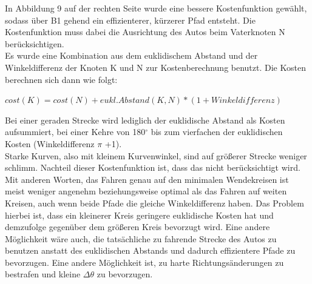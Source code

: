 In Abbildung 9 auf der rechten Seite wurde eine bessere Kostenfunktion gewählt, sodass über B1 gehend ein effizienterer, kürzerer Pfad entsteht. Die Kostenfunktion muss dabei die Ausrichtung des Autos beim Vaterknoten N berücksichtigen. \\
Es wurde eine Kombination aus dem euklidischem Abstand und der Winkeldifferenz der Knoten K und N zur Kostenberechnung benutzt. Die Kosten berechnen sich dann wie folgt: 
\begin{center}
$cost(K) = cost(N) +eukl. Abstand(K,N) * (1+Winkeldifferenz)$
\end{center} 
Bei einer geraden Strecke wird lediglich der euklidische Abstand als Kosten aufsummiert, bei einer Kehre von 180$^{\circ}$ bis zum vierfachen der euklidischen Kosten (Winkeldifferenz $\pi$ +1).\\
Starke Kurven, also mit kleinem Kurvenwinkel, sind auf größerer Strecke weniger schlimm. Nachteil dieser Kostenfunktion ist, dass das nicht berücksichtigt wird. Mit anderen Worten, das Fahren genau auf den minimalen Wendekreisen ist meist weniger angenehm beziehungsweise optimal als das Fahren auf weiten Kreisen, auch wenn beide Pfade die gleiche Winkeldifferenz haben. Das Problem hierbei ist, dass ein kleinerer Kreis geringere euklidische Kosten hat und demzufolge gegenüber dem größeren Kreis bevorzugt wird. Eine andere Möglichkeit wäre auch, die tatsächliche zu fahrende Strecke des Autos zu benutzen anstatt des euklidischen Abstands und dadurch effizientere Pfade zu bevorzugen. Eine andere Möglichkeit ist, zu harte Richtungsänderungen zu bestrafen und kleine $ \Delta \theta$ zu bevorzugen. \\
